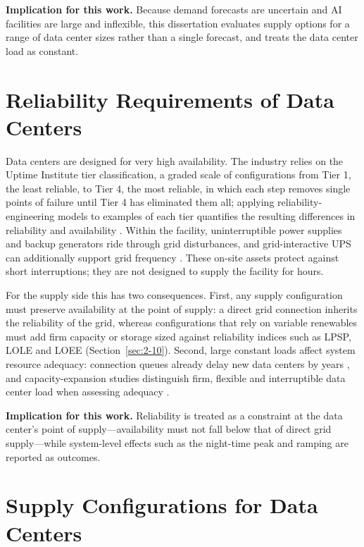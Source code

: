 \textbf{Implication for this work.} Because demand forecasts are uncertain and AI facilities are large and inflexible, this dissertation evaluates supply options for a range of data center sizes rather than a single forecast, and treats the data center load as constant.

\section{Reliability Requirements of Data Centers}\label{sec:2-4}

Data centers are designed for very high availability. The industry relies on the Uptime Institute tier classification, a graded scale of configurations from Tier 1, the least reliable, to Tier 4, the most reliable, in which each step removes single points of failure until Tier 4 has eliminated them all; applying reliability-engineering models to examples of each tier quantifies the resulting differences in reliability and availability \cite{r41}. Within the facility, uninterruptible power supplies and backup generators ride through grid disturbances, and grid-interactive UPS can additionally support grid frequency \cite{r7}. These on-site assets protect against short interruptions; they are not designed to supply the facility for hours.

For the supply side this has two consequences. First, any supply configuration must preserve availability at the point of supply: a direct grid connection inherits the reliability of the grid, whereas configurations that rely on variable renewables must add firm capacity or storage sized against reliability indices such as LPSP, LOLE and LOEE \cite{r31,r32} (Section~\ref{sec:2-10}). Second, large constant loads affect system resource adequacy: connection queues already delay new data centers by years \cite{r28}, and capacity-expansion studies distinguish firm, flexible and interruptible data center load when assessing adequacy \cite{r27}.

\textbf{Implication for this work.} Reliability is treated as a constraint at the data center's point of supply---availability must not fall below that of direct grid supply---while system-level effects such as the night-time peak and ramping are reported as outcomes.

\section{Supply Configurations for Data Centers}\label{sec:2-5}

